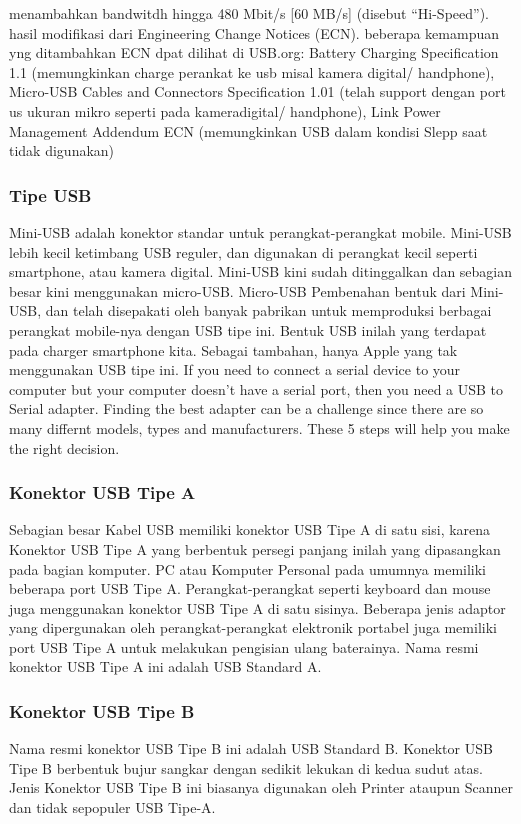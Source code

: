 menambahkan bandwitdh hingga 480 Mbit/s [60 MB/s] (disebut “Hi-Speed”). hasil modifikasi dari Engineering Change Notices (ECN). beberapa kemampuan yng ditambahkan ECN dpat dilihat di USB.org: Battery Charging Specification 1.1 (memungkinkan charge perankat ke usb misal kamera digital/ handphone), Micro-USB Cables and Connectors Specification 1.01 (telah support dengan port us ukuran mikro seperti pada kameradigital/ handphone), Link Power Management Addendum ECN (memungkinkan USB dalam kondisi Slepp saat tidak digunakan)

\subsubsection{Tipe USB}
Mini-USB adalah konektor standar untuk perangkat-perangkat mobile. Mini-USB lebih kecil ketimbang USB reguler, dan digunakan di perangkat kecil seperti smartphone, atau kamera digital. Mini-USB kini sudah ditinggalkan dan sebagian besar kini menggunakan micro-USB.
Micro-USB
Pembenahan bentuk dari Mini-USB, dan telah disepakati oleh banyak pabrikan untuk memproduksi berbagai perangkat mobile-nya dengan USB tipe ini. Bentuk USB inilah yang terdapat pada charger smartphone kita. Sebagai tambahan, hanya Apple yang tak menggunakan USB tipe ini.
If you need to connect a serial device to your computer but your computer doesn't have a serial port, then you need a USB to Serial adapter. Finding the best adapter can be a challenge since there are so many differnt models, types and manufacturers. These 5 steps will help you make the right decision. 

\subsubsection{Konektor USB Tipe A}
Sebagian besar Kabel USB memiliki konektor USB Tipe A di satu sisi, karena Konektor USB Tipe A yang berbentuk persegi panjang inilah yang dipasangkan pada bagian komputer. PC atau Komputer Personal pada umumnya memiliki beberapa port USB Tipe A. Perangkat-perangkat seperti keyboard dan mouse juga menggunakan konektor USB Tipe A di satu sisinya. Beberapa jenis adaptor yang dipergunakan oleh perangkat-perangkat elektronik portabel juga memiliki port USB Tipe A untuk melakukan pengisian ulang baterainya. Nama resmi konektor USB Tipe A ini adalah USB Standard A.

\subsubsection{Konektor USB Tipe B}
Nama resmi konektor USB Tipe B ini adalah USB Standard B. Konektor USB Tipe B berbentuk bujur sangkar dengan sedikit lekukan di kedua sudut atas. Jenis Konektor USB Tipe B ini biasanya digunakan oleh Printer ataupun Scanner dan tidak sepopuler USB Tipe-A.

